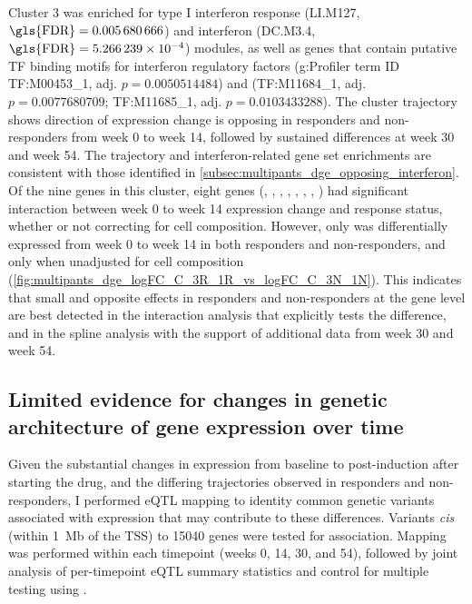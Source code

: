 Cluster 3 was enriched for type I interferon response (LI.M127, $\text{\gls{FDR}} = \num{0.005680666}$) and interferon (DC.M3.4, $\text{\gls{FDR}} = \num[scientific-notation = true]{0.0005266239}$) modules,
as well as genes that contain putative \gls{TF} binding motifs for interferon regulatory factors  ({g:Profiler} \autocite{raudvere2019ProfilerWebServer} term ID TF:M00453\_1, adj. $p=\num{0.0050514484}$) 
and  (TF:M11684\_1, adj. $p=\num{0.0077680709}$; TF:M11685\_1, adj. $p=\num{0.0103433288}$).
The cluster trajectory shows direction of expression change is opposing in responders and non-responders from week 0 to week 14, followed by sustained differences at week 30 and week 54.
The trajectory and interferon-related gene set enrichments are consistent with those identified in \cref{subsec:multipants_dge_opposing_interferon}.
Of the nine genes in this cluster, eight genes (, , , , , , , )
had significant interaction between week 0 to week 14 expression change and response status,
whether or not correcting for cell composition.
However, only  was differentially expressed from week 0 to week 14 in both responders and non-responders,
and only when unadjusted for cell composition (\cref{fig:multipants_dge_logFC_C_3R_1R_vs_logFC_C_3N_1N}).
This indicates that small and opposite effects in responders and non-responders at the gene level are best detected 
in the interaction analysis that explicitly tests the difference,
and in the spline analysis with the support of additional data from week 30 and week 54.

    
\subsection{Limited evidence for changes in genetic architecture of gene expression over time}

Given the substantial changes in expression from baseline to post-induction after starting the drug, and the differing trajectories observed in responders and non-responders, 
I performed \gls{eQTL} mapping to identity common genetic variants associated with expression that may contribute to these differences.
Variants \textit{cis} (within \SI{1}{\mega b} of the \gls{TSS}) to \num{15040} genes were tested for association.
Mapping was performed within each timepoint (weeks 0, 14, 30, and 54),
followed by joint analysis of per-timepoint \gls{eQTL} summary statistics and control for multiple testing using  \autocite{urbut2018FlexibleStatisticalMethods}.

